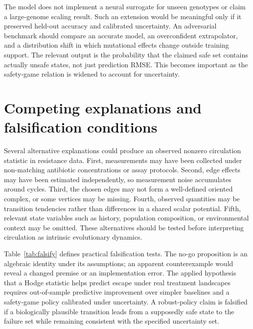 \documentclass[11pt]{article}
\theoremstyle{definition}\newtheorem{definition}[proposition]{Definition}\theoremstyle{remark}\newtheorem{remark}[proposition]{Remark}
\begin{document}
The model does not implement a neural surrogate for unseen genotypes or claim a large-genome scaling result. Such an extension would be meaningful only if it preserved held-out accuracy and calibrated uncertainty. An adversarial benchmark should compare an accurate model, an overconfident extrapolator, and a distribution shift in which mutational effects change outside training support. The relevant output is the probability that the claimed safe set contains actually unsafe states, not just prediction RMSE. This becomes important as the safety-game relation is widened to account for uncertainty.

\section{Competing explanations and falsification conditions}
Several alternative explanations could produce an observed nonzero circulation statistic in resistance data. First, measurements may have been collected under non-matching antibiotic concentrations or assay protocols. Second, edge effects may have been estimated independently, so measurement noise accumulates around cycles. Third, the chosen edges may not form a well-defined oriented complex, or some vertices may be missing. Fourth, observed quantities may be transition tendencies rather than differences in a shared scalar potential. Fifth, relevant state variables such as history, population composition, or environmental context may be omitted. These alternatives should be tested before interpreting circulation as intrinsic evolutionary dynamics.

Table~\ref{tab:falsify} defines practical falsification tests. The no-go proposition is an algebraic identity under its assumptions; an apparent counterexample would reveal a changed premise or an implementation error. The applied hypothesis that a Hodge statistic helps predict escape under real treatment landscapes requires out-of-sample predictive improvement over simpler baselines and a safety-game policy calibrated under uncertainty. A robust-policy claim is falsified if a biologically plausible transition leads from a supposedly safe state to the failure set while remaining consistent with the specified uncertainty set.
\end{document}
